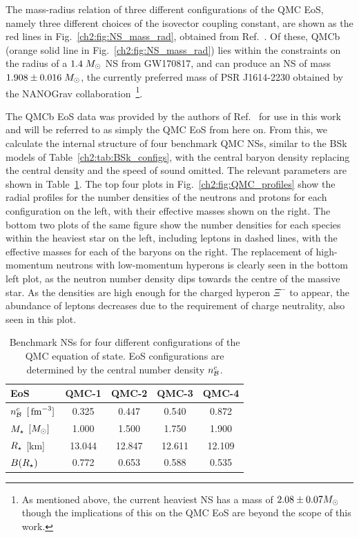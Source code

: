 The mass-radius relation of three different configurations of the QMC EoS, namely three different choices of the isovector coupling constant, are shown as the red lines in Fig.~\ref{ch2:fig:NS_mass_rad}, obtained from Ref.~\cite{Motta:2019tjc_Isovectoreffectsneutron}. Of these, QMCb (orange solid line in Fig.~\ref{ch2:fig:NS_mass_rad}) lies within the constraints on the radius of a $1.4\;M_\odot$ NS from GW170817, and can produce an NS of mass $1.908 \pm 0.016\;M_\odot$, the currently preferred mass of PSR J1614-2230 obtained by the NANOGrav collaboration~\cite{NANOGrav:2017wvv_apr_NANOGrav11yearData}\footnote{As mentioned above, the current heaviest NS has a mass of $2.08\pm 0.07M_\odot$ though the implications of this on the QMC EoS are beyond the scope of this work.}.

The QMCb EoS data was provided by the authors of Ref.~\cite{Motta:2019tjc_Isovectoreffectsneutron} for use in this work and will be referred to as simply the QMC EoS from here on. From this, we calculate the internal structure of four benchmark QMC NSs, similar to the BSk models of Table~\ref{ch2:tab:BSk_configs}, with the central baryon density replacing the central density and the speed of sound omitted. The relevant parameters are shown in Table~\ref{ch2:tab:QMC_configs}. The top four plots in Fig.~\ref{ch2:fig:QMC_profiles} show the radial profiles for the number densities of the neutrons and protons for each configuration on the left, with their effective masses shown on the right. The bottom two plots of the same figure show the number densities for each species within the heaviest star on the left, including leptons in dashed lines, with the effective masses for each of the baryons on the right. The replacement of high-momentum neutrons with low-momentum hyperons is clearly seen in the bottom left plot, as the neutron number density dips towards the centre of the massive star. As the densities are high enough for the charged hyperon $\Xi^-$ to appear, the abundance of leptons decreases due to the requirement of charge neutrality, also seen in this plot. 

\begin{table}[t!bp]
    \centering
    \begin{tabular}{l c c c c}
    \toprule
     EoS &  QMC-1 &  QMC-2 &  QMC-3 &  QMC-4 \\ \midrule\midrule
    $n_{\cal B}^c$ $[{\rm \,fm}^{-3}]$ & 0.325 & 0.447 & 0.540 & 0.872\\
    $M_\star$ $[M_\odot]$ & 1.000 & 1.500 & 1.750 & 1.900  \\
    $R_\star$ [km] &  13.044 & 12.847 & 12.611 & 12.109 \\
    $B(R_\star)$ & 0.772 & 0.653 & 0.588 & 0.535\\
    \bottomrule
    \end{tabular} 
    \caption[Benchmark NSs for four different configurations of the QMC equation of state.]{Benchmark NSs for four different configurations of the QMC equation of state. 
    EoS configurations are determined by the central number density $n_{\cal B}^c$.
    }
    \label{ch2:tab:QMC_configs}
\end{table} 

